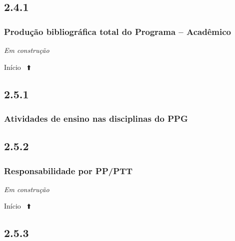 \documentclass[
  a4paper,
]{book}
\begin{document}
\hypertarget{section-17}{%
\subsection{\texorpdfstring{\textbf{2.4.1}}{2.4.1}}\label{section-17}}

\hypertarget{produuxe7uxe3o-bibliogruxe1fica-total-do-programa-acaduxeamico}{%
\subsubsection{\texorpdfstring{\textbf{Produção bibliográfica total do Programa -- Acadêmico}}{Produção bibliográfica total do Programa -- Acadêmico}}\label{produuxe7uxe3o-bibliogruxe1fica-total-do-programa-acaduxeamico}}

\emph{Em construção}

Início ~⬆️

\hypertarget{section-18}{%
\subsection{\texorpdfstring{\textbf{2.5.1}}{2.5.1}}\label{section-18}}

\hypertarget{atividades-de-ensino-nas-disciplinas-do-ppg}{%
\subsubsection{\texorpdfstring{\textbf{Atividades de ensino nas disciplinas do PPG}}{Atividades de ensino nas disciplinas do PPG}}\label{atividades-de-ensino-nas-disciplinas-do-ppg}}

\hypertarget{section-19}{%
\subsection{\texorpdfstring{\textbf{2.5.2}}{2.5.2}}\label{section-19}}

\hypertarget{responsabilidade-por-ppptt}{%
\subsubsection{\texorpdfstring{\textbf{Responsabilidade por PP/PTT}}{Responsabilidade por PP/PTT}}\label{responsabilidade-por-ppptt}}

\emph{Em construção}

Início ~⬆️

\hypertarget{section-20}{%
\subsection{\texorpdfstring{\textbf{2.5.3}}{2.5.3}}\label{section-20}}
\end{document}
